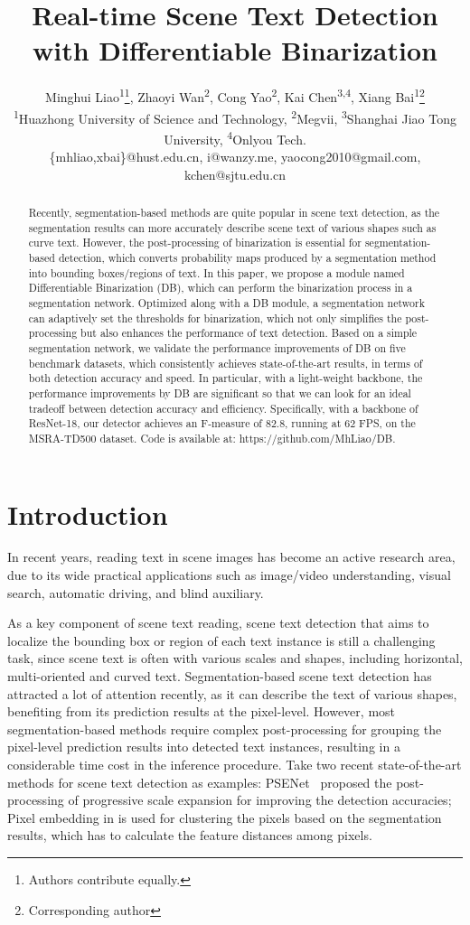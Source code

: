\documentclass[letterpaper]{article} %
\title{Real-time Scene Text Detection with Differentiable Binarization}
\author{
Minghui Liao\textsuperscript{\rm 1}\thanks{Authors contribute equally.},
Zhaoyi Wan\textsuperscript{\rm 2}\footnotemark[\value{footnote}],
Cong Yao\textsuperscript{\rm 2},
Kai Chen\textsuperscript{\rm 3,4},
Xiang Bai\textsuperscript{\rm 1}\thanks{Corresponding author}\\
\textsuperscript{\rm 1}Huazhong University of Science and Technology,
\textsuperscript{\rm 2}Megvii,
\textsuperscript{\rm 3}Shanghai Jiao Tong University,
\textsuperscript{\rm 4}Onlyou Tech.\\
\{mhliao,xbai\}@hust.edu.cn, i@wanzy.me, yaocong2010@gmail.com, kchen@sjtu.edu.cn
}
\begin{document}
\maketitle

\begin{abstract}
Recently, segmentation-based methods are quite popular in scene text detection, as the segmentation results can more accurately describe scene text of various shapes such as curve text. However, the post-processing of binarization is essential for segmentation-based detection, which converts probability maps produced by a segmentation method into bounding boxes/regions of text.
In this paper, we propose a module named Differentiable Binarization (DB), which can perform the binarization process in a segmentation network. Optimized along with a DB module, a segmentation network can adaptively set the thresholds for binarization, which not only simplifies the post-processing but also enhances the performance of text detection. Based on a simple segmentation network, we validate the performance improvements of DB on five benchmark datasets, which consistently achieves state-of-the-art results, in terms of both detection accuracy and speed.
In particular, with a light-weight backbone, the performance improvements by DB are significant so that we can look for an ideal tradeoff between detection accuracy and efficiency.
Specifically, with a backbone of ResNet-18, our detector achieves an F-measure of 82.8, running at 62 FPS, on the MSRA-TD500 dataset. Code is available at: https://github.com/MhLiao/DB.
\end{abstract}

\section{Introduction}

In recent years, reading text in scene images has become an active research area, due to its wide practical applications such as image/video understanding, visual search, automatic driving, and blind auxiliary.

As a key component of scene text reading, scene text detection that aims to localize the bounding box or region of each text instance is still a challenging task, since scene text is often with various scales and shapes, including horizontal, multi-oriented and curved text. Segmentation-based scene text detection has attracted a lot of attention recently, as it can describe the text of various shapes, benefiting from its prediction results at the pixel-level. However, most segmentation-based methods require complex post-processing for grouping the pixel-level prediction results into detected text instances, resulting in a considerable time cost in the inference procedure. Take two recent state-of-the-art methods for scene text detection as examples: PSENet~\cite{wang2019shape} proposed the post-processing of progressive scale expansion for improving the detection accuracies; Pixel embedding in \cite{tian2019learning} is used for clustering the pixels based on the segmentation results, which has to calculate the feature distances among pixels.
\end{document}
